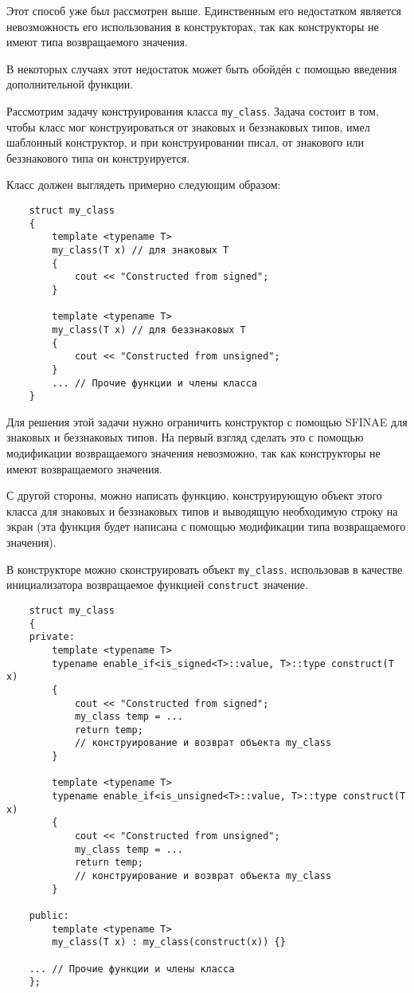 	Этот способ уже был рассмотрен выше. Единственным его недостатком является невозможность его использования в конструкторах, так как конструкторы не имеют типа возвращаемого значения.
	
	В некоторых случаях этот недостаток может быть обойдён с помощью введения дополнительной функции.
	
	Рассмотрим задачу конструирования класса \texttt{my_class}. Задача состоит в том, чтобы класс мог конструироваться от знаковых и беззнаковых типов, имел шаблонный конструктор, и при конструировании писал, от знакового или беззнакового типа он конструируется.
	
	Класс должен выглядеть примерно следующим образом:
	
	\begin{verbatim}
	struct my_class
	{
		template <typename T>
		my_class(T x) // для знаковых T
		{
			cout << "Constructed from signed"; 
		}
		
		template <typename T>
		my_class(T x) // для беззнаковых T
		{
			cout << "Constructed from unsigned"; 
		}
		... // Прочие функции и члены класса
	}
	\end{verbatim}
	
	Для решения этой задачи нужно ограничить конструктор с помощью SFINAE для знаковых и беззнаковых типов. На первый взгляд сделать это с помощью модификации возвращаемого значения невозможно, так как конструкторы не имеют возвращаемого значения.
	
	С другой стороны, можно написать функцию, конструирующую объект этого класса для знаковых и беззнаковых типов и выводящую необходимую строку на экран (эта функция будет написана с помощью модификации типа возвращаемого значения).
	
	В конструкторе можно сконструировать объект \texttt{my_class}, использовав в качестве инициализатора возвращаемое функцией \texttt{construct} значение.
	
	\begin{verbatim}
	struct my_class
	{
	private:
		template <typename T>
		typename enable_if<is_signed<T>::value, T>::type construct(T x)
		{
			cout << "Constructed from signed"; 
			my_class temp = ...
			return temp;
			// конструирование и возврат объекта my_class 
		}
	
		template <typename T>
		typename enable_if<is_unsigned<T>::value, T>::type construct(T x)
		{
			cout << "Constructed from unsigned";
			my_class temp = ...
			return temp;
			// конструирование и возврат объекта my_class 
		}
		
	public:
		template <typename T>
		my_class(T x) : my_class(construct(x)) {}
		
	... // Прочие функции и члены класса
	};
	\end{verbatim}

